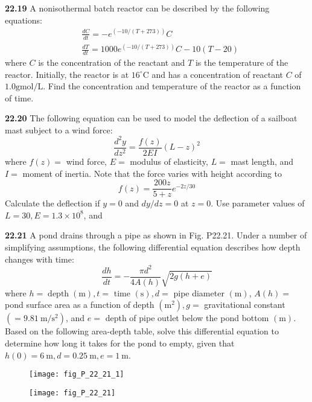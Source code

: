 \begin{multicols}{2}
    \noindent\textbf{22.19} A nonisothermal batch reactor can be described by the following equations:
    $$
    \begin{aligned}
    &\frac{d C}{d t}=-e^{(-10 /(T+273))} C \\
    &\frac{d T}{d t}=1000 e^{(-10 /(T+273))} C-10(T-20)
    \end{aligned}
    $$
    where $C$ is the concentration of the reactant and $T$ is the temperature of the reactor. Initially, the reactor is at $16^{\circ} \mathrm{C}$ and has a concentration of reactant $C$ of $1.0 \mathrm{gmol} / \mathrm{L}$. Find the concentration and temperature of the reactor as a function of time.\vspace{2mm}

    \noindent\textbf{22.20} The following equation can be used to model the deflection of a sailboat mast subject to a wind force:
    $$
    \frac{d^{2} y}{d z^{2}}=\frac{f(z)}{2 E I}(L-z)^{2}
    $$
    where $f(z)=$ wind force, $E=$ modulus of elasticity, $L=$ mast length, and $I=$ moment of inertia. Note that the force varies with height according to
    $$
    f(z)=\frac{200 z}{5+z} e^{-2 z / 30}
    $$
    Calculate the deflection if $y=0$ and $d y / d z=0$ at $z=0$. Use parameter values of $L=30, E=1.3 \times 10^{8}$, and\vspace{2mm}

    \noindent\textbf{22.21} A pond drains through a pipe as shown in Fig. P22.21. Under a number of simplifying assumptions, the following differential equation describes how depth changes with time:$$\frac{d h}{d t}=-\frac{\pi d^{2}}{4 A(h)} \sqrt{2 g(h+e)}$$
    where $h=\operatorname{depth}(\mathrm{m}), t=$ time $(\mathrm{s}), d=$ pipe diameter $(\mathrm{m})$, $A(h)=$ pond surface area as a function of depth $\left(\mathrm{m}^{2}\right), g=$ gravitational constant $\left(=9.81 \mathrm{~m} / \mathrm{s}^{2}\right)$, 
    and $e=$ depth of pipe outlet below the pond bottom $(\mathrm{m})$. Based on the following area-depth table, solve this differential equation to determine how long it takes for the pond to empty, given that $h(0)=6 \mathrm{~m}, d=0.25 \mathrm{~m}, e=1 \mathrm{~m}$.

    \begin{figure}[H]
        \centering
        \texttt{[image: fig\_P\_22\_21\_1]}
        \label{fig:fig_P_22_21_1}
    \end{figure}
    
    \begin{figure}[H]
        \centering
        \texttt{[image: fig\_P\_22\_21]}
        \caption{\textsf{}}
        \label{fig:fig_P_22_21}
    \end{figure}\vspace{2mm}


\end{multicols}
